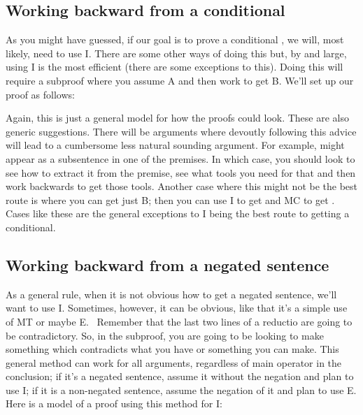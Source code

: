 \subsection{Working backward from a conditional}

As you might have guessed, if our goal is to prove a conditional \eif{}, we will, most likely, need to use \eif I. There are some other ways of doing this but, by and large, using \eif I is the most efficient (there are some exceptions to this). Doing this will require a subproof where you assume A and then work to get B. We’ll set up our proof as follows:
\begin{fitchproof}
\ellipsesline			
{}			
\open
{}			
\ellipsesline		
{}			
\close
{}	
\end{fitchproof}

Again, this is just a general model for how the proofs could look. These are also generic suggestions. There will be arguments where devoutly following this advice will lead to a cumbersome less natural sounding argument. For example, \eif {} might appear as a subsentence in one of the premises. In which case, you should look to see how to extract it from the premise, see what tools you need for that and then work backwards to get those tools. Another case where this might not be the best route is where you can get just B; then you can use \eor I to get \enot {}\eor {} and MC to get \eif {}. Cases like these are the general exceptions to \eif I being the best route to getting a conditional.

\subsection{Working backward from a negated sentence}

As a general rule, when it is not obvious how to get a negated sentence, we'll want to use \enot I. Sometimes, however, it can be obvious, like that it's a simple use of MT or maybe \eif E.  Remember that the last two lines of a reductio are going to be contradictory. So, in the subproof, you are going to be looking to make something which contradicts what you have or something you can make. This general method can work for all arguments, regardless of main operator in the conclusion; if it's a negated sentence, assume it without the negation and plan to use \enot I; if it is a non-negated sentence, assume the negation of it and plan to use \enot E. Here is a model of a proof using this method for \enot I:
\begin{fitchproof}
\ellipsesline			
{}			
\open
{}			
\ellipsesline		
{}	
\close
{}	
\end{fitchproof}

